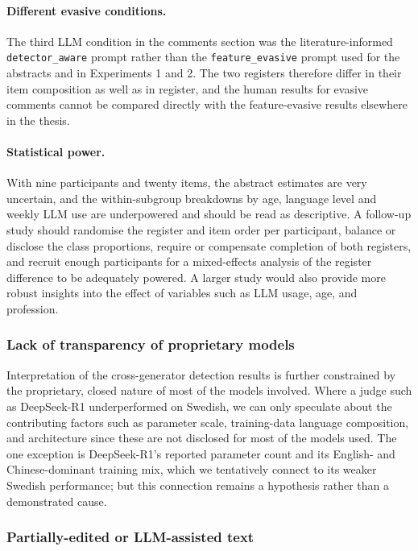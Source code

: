 \documentclass[thesis]{cluu}
\begin{document}
\paragraph{Different evasive conditions.} The third LLM condition in the comments section was the literature-informed \texttt{detector\_aware} prompt rather than the \texttt{feature\_evasive} prompt used for the abstracts and in Experiments 1 and 2. The two registers therefore differ in their item composition as well as in register, and the human results for evasive comments cannot be compared directly with the feature-evasive results elsewhere in the thesis.

\paragraph{Statistical power.} With nine participants and twenty items, the abstract estimates are very uncertain, and the within-subgroup breakdowns by age, language level and weekly LLM use are underpowered and should be read as descriptive. A follow-up study should randomise the register and item order per participant, balance or disclose the class proportions, require or compensate completion of both registers, and recruit enough participants for a mixed-effects analysis of the register difference to be adequately powered. A larger study would also provide more robust insights into the effect of variables such as LLM usage, age, and profession.

\subsubsection{Lack of transparency of proprietary models}
Interpretation of the cross-generator detection results is further constrained by the proprietary, closed nature of most of the models involved. Where a judge such as DeepSeek-R1 underperformed on Swedish, we can only speculate about the contributing factors such as parameter scale, training-data language composition, and architecture since these are not disclosed for most of the models used. The one exception is DeepSeek-R1's reported parameter count and its English- and Chinese-dominant training mix, which we tentatively connect to its weaker Swedish performance; but this connection remains a hypothesis rather than a demonstrated cause.

\subsubsection{Partially-edited or LLM-assisted text}
\end{document}
